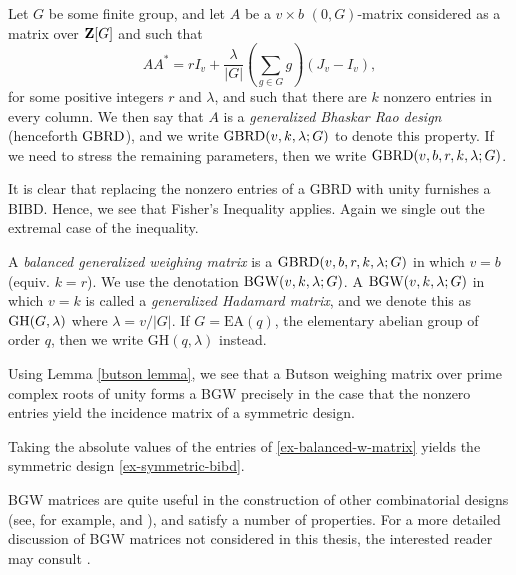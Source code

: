\documentclass[../../../main]{subfiles}
\begin{document}
\begin{defin}\label{gbrd definition}
  Let $G$ be some finite group, and let $A$ be a $v \times b$ $(0,G)$-matrix
  considered as a matrix over $\mathbf{Z}[G]$ and such that 
  \begin{equation}\label{gbrd-eq}
    AA^* = rI_v + \frac{\lambda}{|G|}\left(\sum_{g \in G}g\right)(J_v - I_v),
  \end{equation}
  for some positive integers $r$ and $\lambda$, and such that there are $k$
  nonzero entries in every column. We then say that $A$ is a {\it generalized
    Bhaskar Rao design} (henceforth $\text{GBRD}$), and we write
  $\text{GBRD}(v,k,\lambda;G)$ to denote this property. If we need to stress the
  remaining parameters, then we write $\text{GBRD}(v,b,r,k,\lambda;G)$. 
\end{defin}

It is clear that replacing the nonzero entries of a GBRD with unity furnishes a
BIBD. Hence, we see that Fisher's Inequality applies. Again we single out the
extremal case of the inequality.

\begin{defin}\label{bgw definition}
  A {\it balanced generalized weighing matrix} is a $\text{GBRD}(v,b,r,k,\lambda;G)$
  in which $v = b$ (equiv. $k = r$). We use the denotation
  $\text{BGW}(v,k,\lambda;G)$. A $\text{BGW}(v,k,\lambda;G)$ in which $v = k$ is called a
  {\it generalized Hadamard matrix}, and we denote this as $\text{GH}(G,\lambda)$
  where $\lambda = v/|G|$. If $G = \mathrm{EA}(q)$, the elementary abelian
  group of order $q$, then we
  write $\mathrm{GH}(q,\lambda)$ instead. 
\end{defin}

Using Lemma \ref{butson lemma}, we see that a Butson weighing matrix over prime
complex roots of unity forms a BGW precisely in the case that the nonzero
entries yield the incidence matrix of a symmetric design.

\begin{ex}
  Taking the absolute values of the entries of \ref{ex-balanced-w-matrix} yields
  the symmetric design \ref{ex-symmetric-bibd}.
\end{ex}

BGW matrices are quite useful in the construction of other combinatorial designs
(see, for example, \citeauthor{ionin-kharaghani-drad}
\citeyear{ionin-kharaghani-drad} and \citeyear{ionin-kharaghani-srg}), and
satisfy a number of properties. For a more detailed discussion of BGW matrices
not considered in this thesis, the interested reader may consult
\cite{combinatorics-of-symmetric-designs}. 
\end{document}
